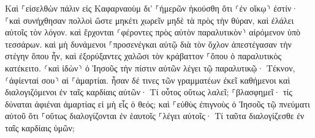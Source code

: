 \documentclass{openreader}
\begin{document}
Καὶ ⸀εἰσελθὼν πάλιν εἰς Καφαρναοὺμ δι’ ⸀ἡμερῶν ἠκούσθη ὅτι ⸂ἐν οἴκῳ⸃ ἐστίν· 
⸀καὶ συνήχθησαν πολλοὶ ὥστε μηκέτι χωρεῖν μηδὲ τὰ πρὸς τὴν θύραν, καὶ ἐλάλει αὐτοῖς τὸν λόγον. 
καὶ ἔρχονται ⸂φέροντες πρὸς αὐτὸν παραλυτικὸν⸃ αἰρόμενον ὑπὸ τεσσάρων. 
καὶ μὴ δυνάμενοι ⸀προσενέγκαι αὐτῷ διὰ τὸν ὄχλον ἀπεστέγασαν τὴν στέγην ὅπου ἦν, καὶ ἐξορύξαντες χαλῶσι τὸν κράβαττον ⸀ὅπου ὁ παραλυτικὸς κατέκειτο. 
⸂καὶ ἰδὼν⸃ ὁ Ἰησοῦς τὴν πίστιν αὐτῶν λέγει τῷ παραλυτικῷ· Τέκνον, ⸂ἀφίενταί σου⸃ αἱ ⸀ἁμαρτίαι. 
ἦσαν δέ τινες τῶν γραμματέων ἐκεῖ καθήμενοι καὶ διαλογιζόμενοι ἐν ταῖς καρδίαις αὐτῶν· 
Τί οὗτος οὕτως λαλεῖ; ⸀βλασφημεῖ· τίς δύναται ἀφιέναι ἁμαρτίας εἰ μὴ εἷς ὁ θεός; 
καὶ ⸀εὐθὺς ἐπιγνοὺς ὁ Ἰησοῦς τῷ πνεύματι αὐτοῦ ὅτι ⸀οὕτως διαλογίζονται ἐν ἑαυτοῖς ⸀λέγει αὐτοῖς· Τί ταῦτα διαλογίζεσθε ἐν ταῖς καρδίαις ὑμῶν; 
\end{document}
